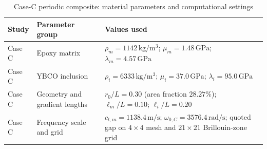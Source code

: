 \begin{table}[p]
\centering
\caption{Case-C periodic composite: material parameters and computational settings}
\label{tab:s1_caseC_parameters}
\footnotesize
\renewcommand{\arraystretch}{1.18}
\begin{tabular}{@{}p{}p{}p{}@{}}
\toprule
Study & Parameter group & Values used \\
\midrule
Case C & Epoxy matrix & $\rho_m=1142\,\mathrm{kg/m^3}$; $\mu_m=1.48\,\mathrm{GPa}$; $\lambda_m=4.57\,\mathrm{GPa}$ \cite{zhanwei2010} \\
Case C & YBCO inclusion & $\rho_i=6333\,\mathrm{kg/m^3}$; $\mu_i=37.0\,\mathrm{GPa}$; $\lambda_i=95.0\,\mathrm{GPa}$ \cite{zhanwei2010} \\
Case C & Geometry and gradient lengths & $r_0/L=0.30$ (area fraction $28.27\%$); $\ell_m/L=0.10$; $\ell_i/L=0.20$ \\
Case C & Frequency scale and grid & $c_{t,m}=1138.4\,\mathrm{m/s}$; $\omega_{0,C}=3576.4\,\mathrm{rad/s}$; quoted gap on $4\times4$ mesh and $21\times21$ Brillouin-zone grid \\
\bottomrule
\end{tabular}
\end{table}

